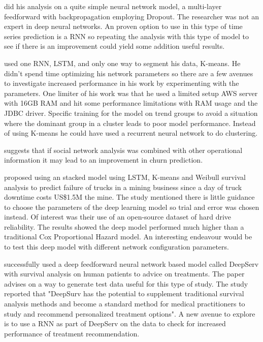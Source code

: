\documentclass[final,a4paper,peerreviewca]{IEEEtran}
\begin{document}
\cite{Spanoudes:2017} did his analysis on a quite simple neural network model, a multi-layer feedforward with backpropagation employing Dropout. The researcher was not an expert in deep neural networks.  An proven option to use in this type of time series prediction is a RNN so repeating the analysis with this type of model to see if there is an improvement could yield some addition useful results.

\cite{Ljungehed:2017} used one RNN, LSTM, and only one way to segment his data, K-means. He didn't spend time optimizing his network parameters so there are a few avenues to investigate increased performance in his work by experimenting with the parameters. One limiter of his work was that he used a limited setup AWS server with 16GB RAM and hit some performance limitations with RAM usage and the JDBC driver. Specific training for the model on trend groups to avoid a situation where the dominant group in a cluster leads to poor model performance. Instead of using K-means he could have used a recurrent neural network to do clustering.

\cite{Backiel:2016} suggests that if social network analysis was combined with other operational information it may lead to an improvement in churn prediction.

\cite{Liao:2016} proposed using an stacked model using LSTM, K-means and Weibull survival analysis to predict failure of trucks in a mining business since a day of truck downtime costs US\$1.5M the mine. The study mentioned there is little guidance to choose the parameters of the deep learning model so trial and error was chosen instead. Of interest was their use of an open-source dataset of hard drive reliability. The results showed the deep model performed much higher than a traditional Cox Proportional Hazard model. An interesting endeavour would be to test this deep model with different network configuration parameters.

\cite{Katzman:2016} successfully used a deep feedforward neural network based model called DeepServ with survival analysis on human patients to advice on treatments. The paper advises on a way to generate test data useful for this type of study. The study reported that "DeepSurv has the potential to supplement traditional survival analysis methods and become a standard method for medical practitioners to study and recommend personalized treatment options". A new avenue to explore is to use a RNN as part of DeepServ on the data to check for increased performance of treatment recommendation.
\end{document}
